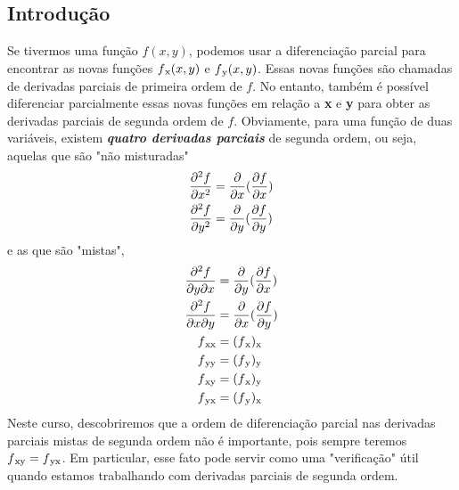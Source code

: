 \documentclass[a4paper]{article}
\begin{document}
\subsection*{Introdução}
\par Se tivermos uma função $f(x,y)$, podemos usar a diferenciação parcial para encontrar as novas funções $f\textsubscript{x}(x,y)$ e $f\textsubscript{y}(x,y)$. Essas novas funções são chamadas de derivadas parciais de primeira ordem de $f$. No entanto, também é possível diferenciar parcialmente essas novas funções em relação a \textbf{x} e \textbf{y} para obter as derivadas parciais de segunda ordem de $f$. Obviamente, para uma função de duas variáveis, existem \textit{\textbf{quatro derivadas parciais}} de segunda ordem, ou seja, aquelas que são "não misturadas"
\begin{equation}
    \begin{split}
        \frac{\partial\textsuperscript{2}f}{\partial x\textsuperscript{2}} & = \frac{\partial}{\partial x}(\frac{\partial f}{\partial x}) \\
        \frac{\partial\textsuperscript{2}f}{\partial y\textsuperscript{2}} & = \frac{\partial}{\partial y}(\frac{\partial f}{\partial y}) 
    \end{split}
\end{equation}
e as que são "mistas", 
\begin{equation}
    \begin{split}
        \frac{\partial\textsuperscript{2}f}{\partial y \partial x} & = \frac{\partial}{\partial y}(\frac{\partial f}{\partial x}) \\
        \frac{\partial\textsuperscript{2}f}{\partial x \partial y} & = \frac{\partial}{\partial x}(\frac{\partial f}{\partial y}) \\
        f\textsubscript{xx} &= (f\textsubscript{x})\textsubscript{x} \\
        f\textsubscript{yy} &= (f\textsubscript{y})\textsubscript{y} \\
        f\textsubscript{xy} &= (f\textsubscript{x})\textsubscript{y} \\
        f\textsubscript{yx} &= (f\textsubscript{y})\textsubscript{x} 
    \end{split}
\end{equation}
Neste curso, descobriremos que a ordem de diferenciação parcial nas derivadas parciais mistas de segunda ordem não é importante, pois sempre teremos $f\textsubscript{xy} = f\textsubscript{yx}$. Em particular, esse fato pode servir como uma "verificação" útil quando estamos trabalhando com derivadas parciais de segunda ordem.
\end{document}
